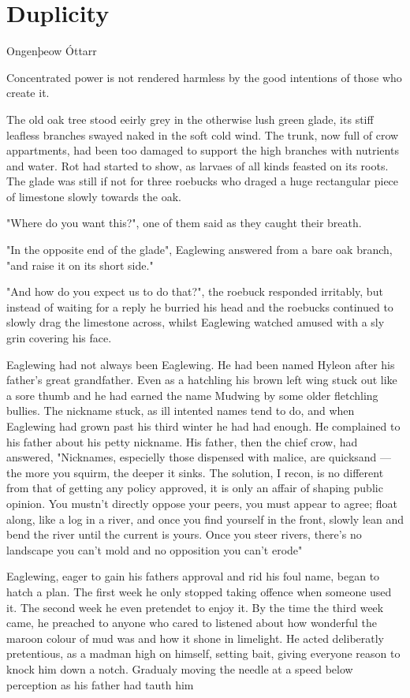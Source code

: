 \chapter{Duplicity}

Ongenþeow Óttarr


Concentrated power is not rendered harmless by the good intentions of those who create it.

The old oak tree stood eeirly grey in the otherwise lush green glade, its stiff leafless branches swayed naked in the soft cold wind. The trunk, now full of crow appartments, had been too damaged to support the high branches with nutrients and water. Rot had started to show, as larvaes of all kinds feasted on its roots. The glade was still if not for three roebucks who draged a huge rectangular piece of limestone slowly towards the oak.

"Where do you want this?", one of them said as they caught their breath.

"In the opposite end of the glade", Eaglewing answered from a bare oak branch, "and raise it on its short side."

"And how do you expect us to do that?", the roebuck responded irritably, but instead of waiting for a reply he burried his head and the roebucks continued to slowly drag the limestone across, whilst Eaglewing watched amused with a sly grin covering his face.  
	
Eaglewing had not always been Eaglewing. He had been named Hyleon after his father's great grandfather. Even as a hatchling his brown left wing stuck out like a sore thumb and he had earned the name Mudwing by some older fletchling bullies. The nickname stuck, as ill intented names tend to do, and when Eaglewing had grown past his third winter he had had enough. He  complained to his father about his petty nickname. His father, then the chief crow, had answered, "Nicknames, especielly those dispensed with malice, are quicksand — the more you squirm, the deeper it sinks. The solution, I recon, is no different from that of getting any policy approved, it is only an affair of shaping public opinion. You mustn't directly oppose your peers, you must appear to agree; float along, like a log in a river, and once you find yourself in the front, slowly lean and bend the river until the current is yours. Once you steer rivers, there's no landscape you can't mold and no opposition you can't erode"

Eaglewing, eager to gain his fathers approval and rid his foul name, began to hatch a plan. The first week he only stopped taking offence when someone used it. The second week he even pretendet to enjoy it. By the time the third week came, he preached to anyone who cared to listened about how wonderful the maroon colour of mud was and how it shone in limelight. He acted deliberatly pretentious, as a madman high on himself, setting bait, giving everyone reason to knock him down a notch. Gradualy moving the needle at a speed below perception as his father had tauth him

